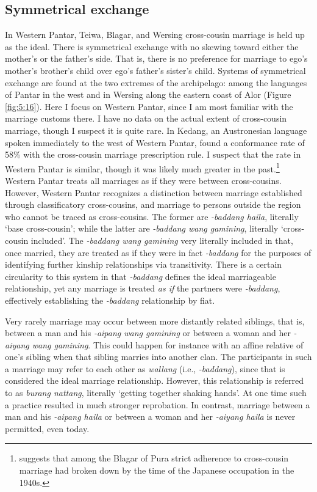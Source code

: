 \subsection{Symmetrical exchange}
In Western Pantar, Teiwa, Blagar, and Wersing cross-cousin marriage is held up as the ideal. There is symmetrical exchange with no skewing toward either the mother's or the father's side. That is, there is no preference for marriage to ego's mother's brother's child over ego's father's sister's child. Systems of symmetrical exchange are found at the two extremes of the archipelago: among the languages of Pantar in the west and in Wersing along the eastern coast of Alor (Figure \ref{fig:5:16}). Here I focus on Western Pantar, since I am most familiar with the marriage customs there. I have no data on the actual extent of cross-cousin marriage, though I suspect it is quite rare. In Kedang, an Austronesian language spoken immediately to the west of Western Pantar, \citet[88]{Barnes1980} found a conformance rate of 58\% with the cross-cousin marriage prescription rule. I suspect that the rate in Western Pantar is similar, though it was likely much greater in the past.\footnote{\citet{Steinhauer2010} suggests that among the Blagar of Pura strict adherence to cross-cousin marriage had broken down by the time of the Japanese occupation in the 1940s.} Western Pantar treats all marriages as if they were between cross-cousins. However, Western Pantar recognizes a distinction between marriage established through classificatory cross-cousins, and marriage to persons outside the region who cannot be traced as cross-cousins. The former are \textit{-baddang haila}, literally `base cross-cousin'; while the latter are \textit{-baddang wang gamining}, literally `cross-cousin included'. The \textit{-baddang wang gamining} very literally included in that, once married, they are treated as if they were in fact \textit{-baddang} for the purposes of identifying further kinship relationships via transitivity. There is a certain circularity to this system in that \textit{-baddang} defines the ideal marriageable relationship, yet any marriage is treated \textit{as if} the partners were \textit{-baddang}, effectively establishing the \textit{-baddang} relationship by fiat. 

Very rarely marriage may occur between more distantly related siblings, that is, between a man and his \textit{-aipang wang gamining} or between a woman and her \textit{-aiyang wang gamining}. This could happen for instance with an affine relative of one's sibling when that sibling marries into another clan. The participants in such a marriage may refer to each other as \textit{wallang} (i.e., \textit{-baddang}), since that is considered the ideal marriage relationship. However, this relationship is referred to as \textit{burang nattang}, literally `getting together shaking hands'. At one time such a practice resulted in much stronger reprobation. In contrast, marriage between a man and his \textit{-aipang haila} or between a woman and her \textit{-aiyang haila} is never permitted, even today.

